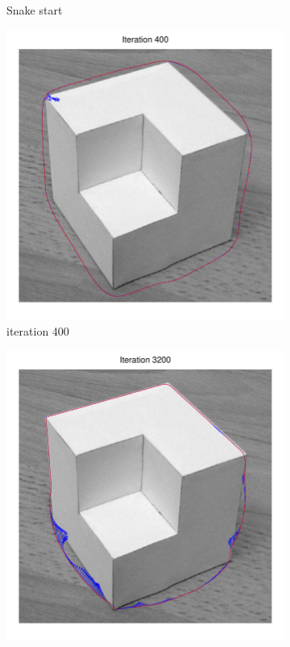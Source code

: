 \documentclass[11pt,a4paper]{article}
\begin{document}
\begin{figure}[H]
\begin{subfigure}[t]{0.21\textwidth}
        \caption{Snake start}
        \label{fig:cubic_log_grayscale}
    \end{subfigure}
    \begin{subfigure}[t]{0.21\textwidth}
        \includegraphics[width=\textwidth]{src/images/cubic_log_400.pdf}
        \caption{iteration 400}
        \label{fig:cubic_log_400}
    \end{subfigure}
    \begin{subfigure}[t]{0.21\textwidth}
        \includegraphics[width=\textwidth]{src/images/cubic_log_3200.pdf}

\end{subfigure}
\end{figure}
\end{document}
